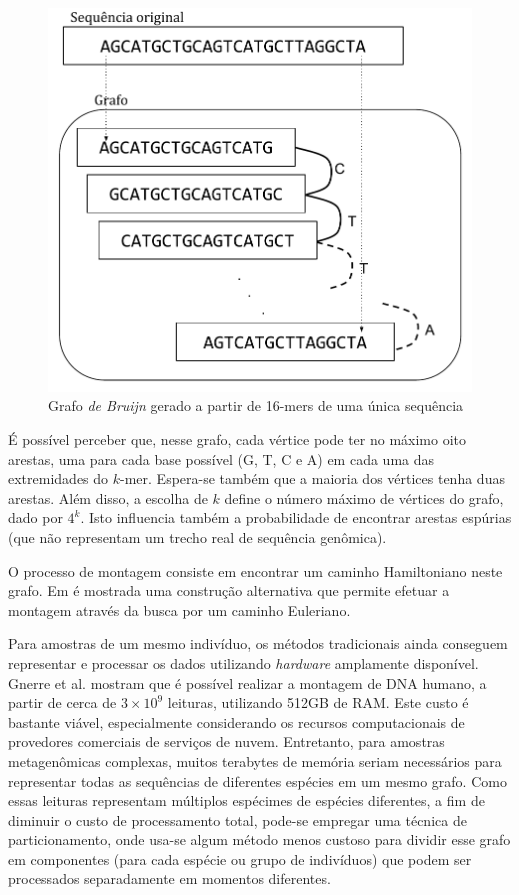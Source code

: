 \begin{figure}[!htbp]
  \centering
  \includegraphics[scale=0.6]{figures/graph_dna_bruijn.pdf}
  \caption{Grafo \emph{de Bruijn} gerado a partir de 16-mers de uma única sequência}
  \label{fig:graph_dna_bruijn}
\end{figure}

É possível perceber que, nesse grafo, cada vértice pode ter no máximo oito arestas, uma para cada base possível (G, T, C e A) em cada uma das extremidades do $k$-mer. Espera-se também que a maioria dos vértices tenha duas arestas. Além disso, a escolha de $k$ define o número máximo de vértices do grafo, dado por $4^k$. Isto influencia também a probabilidade de encontrar arestas espúrias (que não representam um trecho real de sequência genômica).

O processo de montagem consiste em encontrar um caminho Hamiltoniano neste grafo. Em \cite{pevzner2001eulerian} é mostrada uma construção alternativa que permite efetuar a montagem através da busca por um caminho Euleriano.

Para amostras de um mesmo indivíduo, os métodos tradicionais ainda conseguem representar e processar os dados utilizando \emph{hardware} amplamente disponível. Gnerre et al. \cite{gnerre2011high} mostram que é possível realizar a montagem de DNA humano, a partir de cerca de $3 \times 10^9$ leituras, utilizando 512GB de RAM. Este custo é bastante viável, especialmente considerando os recursos computacionais de provedores comerciais de serviços de nuvem. Entretanto, para amostras metagenômicas complexas, muitos terabytes de memória seriam necessários para representar todas as sequências de diferentes espécies em um mesmo grafo. Como essas leituras representam múltiplos espécimes de espécies diferentes, a fim de diminuir o custo de processamento total, pode-se empregar uma técnica de particionamento, onde usa-se algum método menos custoso para dividir esse grafo em componentes (para cada espécie ou grupo de indivíduos) que podem ser processados separadamente em momentos diferentes.

